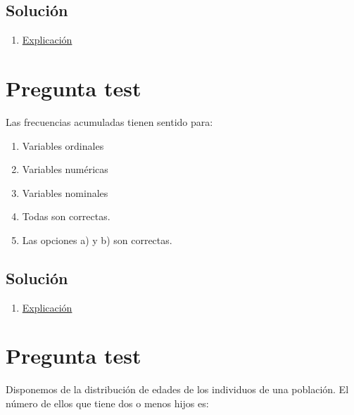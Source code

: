 \documentclass[
]{book}
\providecommand{\tightlist}{%
  \setlength{\itemsep}{0pt}\setlength{\parskip}{0pt}}
\begin{document}
\hypertarget{soluciuxf3n-16}{%
\subsection{Solución}\label{soluciuxf3n-16}}

\begin{enumerate}
\def\labelenumi{\alph{enumi})}
\setcounter{enumi}{2}
\tightlist
\item
  \href{https://1fjmanzano.github.io/bioestadistica/tipos-de-variables.html}{Explicación}
\end{enumerate}

\hypertarget{pregunta-test-15}{%
\section{Pregunta test}\label{pregunta-test-15}}

Las frecuencias acumuladas tienen sentido para:

\begin{enumerate}
\def\labelenumi{\alph{enumi})}
\tightlist
\item
  Variables ordinales
\item
  Variables numéricas
\item
  Variables nominales
\item
  Todas son correctas.
\item
  Las opciones a) y b) son correctas.
\end{enumerate}

\hypertarget{soluciuxf3n-17}{%
\subsection{Solución}\label{soluciuxf3n-17}}

\begin{enumerate}
\def\labelenumi{\alph{enumi})}
\setcounter{enumi}{4}
\tightlist
\item
  \href{https://1fjmanzano.github.io/bioestadistica/tablas-de-frecuencias.html}{Explicación}
\end{enumerate}

\hypertarget{pregunta-test-16}{%
\section{Pregunta test}\label{pregunta-test-16}}

Disponemos de la distribución de edades de los individuos de una población. El número de ellos que tiene dos o menos hijos es:
\end{document}
